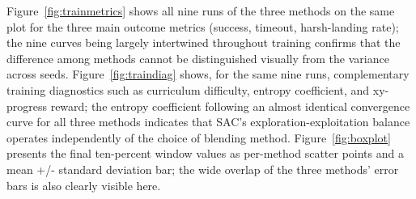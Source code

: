 Figure~\ref{fig:trainmetrics} shows all nine runs of the three methods on the same plot for the three main outcome metrics (success, timeout, harsh-landing rate); the nine curves being largely intertwined throughout training confirms that the difference among methods cannot be distinguished visually from the variance across seeds. Figure~\ref{fig:traindiag} shows, for the same nine runs, complementary training diagnostics such as curriculum difficulty, entropy coefficient, and xy-progress reward; the entropy coefficient following an almost identical convergence curve for all three methods indicates that SAC's exploration-exploitation balance operates independently of the choice of blending method. Figure~\ref{fig:boxplot} presents the final ten-percent window values as per-method scatter points and a mean +/- standard deviation bar; the wide overlap of the three methods' error bars is also clearly visible here.
